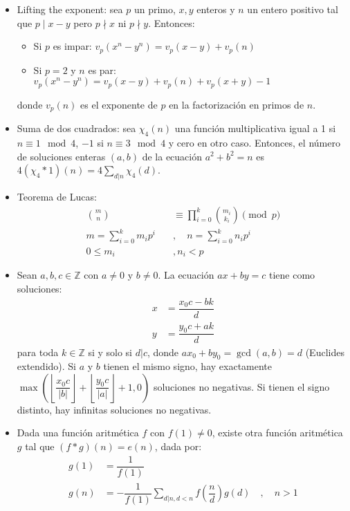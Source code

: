 \documentclass[11pt]{article}
\newcommand{\abs}[1]{\left\lvert #1 \right\lvert}
\begin{document}
			\begin{itemize}
				\item Lifting the exponent: sea $p$ un primo, $x,y$ enteros y $n$ un entero positivo tal que $p \mid x-y$ pero $p \nmid x$ ni $p \nmid y$. Entonces:
				\begin{itemize}
					\item Si $p$ es impar: $v_p(x^n-y^n) = v_p(x-y) + v_p(n)$
					\item Si $p=2$ y $n$ es par: $v_p(x^n-y^n) = v_p(x-y) + v_p(n) + v_p(x+y) - 1$
				\end{itemize}
				donde $v_p(n)$ es el exponente de $p$ en la factorización en primos de $n$.
				\item Suma de dos cuadrados: sea $\chi_4(n)$ una función multiplicativa igual a 1 si $n \equiv 1 \mod 4$, $-1$ si $n \equiv 3 \mod 4$ y cero en otro caso. Entonces, el número de soluciones enteras $(a,b)$ de la ecuación $a^2+b^2=n$ es $4(\chi_4 * 1)(n) = 4 \displaystyle \sum_{d | n} \chi_4(d)$.
				\item Teorema de Lucas:
				\begin{align*}
					\binom{m}{n} &\equiv \prod_{i=0}^{k} \binom{m_i}{k_i} \pmod{p} \\
					m = \sum_{i=0}^{k} m_i p^i \quad &, \quad n = \sum_{i=0}^{k} n_i p^i \\
					0 \leq m_i &, n_i < p
				\end{align*}
				
				\item Sean $a,b,c \in \mathbb{Z}$ con $a \neq 0$ y $b \neq 0$. La ecuación $ax+by=c$ tiene como soluciones:
				\begin{align*}
					x &= \dfrac{x_0 c - bk}{d} \\
					y &= \dfrac{y_0 c + ak}{d} 
				\end{align*}
				para toda $k \in \mathbb{Z}$ si y solo si $d | c$, donde $ax_0+by_0=\gcd(a,b)=d$ (Euclides extendido). Si $a$ y $b$ tienen el mismo signo, hay exactamente $\max\left( \left\lfloor\dfrac{x_0 c}{\abs{b}}\right\rfloor + \left\lfloor\dfrac{y_0 c}{\abs{a}}\right\rfloor + 1, 0 \right)$ soluciones no negativas. Si tienen el signo distinto, hay infinitas soluciones no negativas.
				
				\item Dada una función aritmética $f$ con $f(1) \neq 0$, existe otra función aritmética $g$ tal que $(f*g)(n)=e(n)$, dada por:
				\begin{align*}
					g(1) &= \dfrac{1}{f(1)} \\
					g(n) &= -\dfrac{1}{f(1)} \sum_{d | n, d<n} f\left(\dfrac{n}{d}\right)g(d) \quad , \quad n > 1
				\end{align*}
				

\end{itemize}
\end{document}
